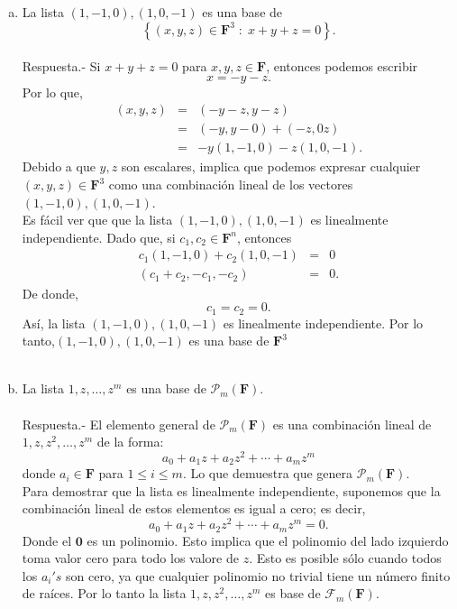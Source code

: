 \begin{enumerate}[\bfseries 1.]
\begin{enumerate}[(a)]
	    \item La lista $(1,-1,0),(1,0,-1)$ es una base de
	    $$\left\{(x,y,z)\in\textbf{F}^3\; : \; x+y+z=0\right\}.$$\\
		Respuesta.-\; Si $x+y+z=0$ para $x,y,z\in \textbf{F}$, entonces podemos escribir 
		$$x=-y-z.$$ 
		Por lo que,
		$$
		\begin{array}{rcl}
		    (x,y,z)&=&(-y-z,y-z)\\
			   &=& (-y,y-0)+(-z,0z)\\
			   &=& -y(1,-1,0)-z(1,0,-1).
		\end{array}
		$$
		Debido a que $y,z$ son escalares, implica que podemos expresar cualquier $(x,y,z)\in\textbf{F}^3$ como una combinación lineal de los vectores $(1,-1,0),(1,0,-1)$. \\

		Es fácil ver que que la lista $(1,-1,0),(1,0,-1)$ es linealmente independiente. Dado que, si $c_1,c_2\in\textbf{F}^n$, entonces 
		$$
		\begin{array}{rcl}
		    c_1(1,-1,0)+c_2(1,0,-1)&=&0\\
		    (c_1+c_2,-c_1,-c_2)&=&0.
		\end{array}
		$$
		De donde,
		$$c_1=c_2=0.$$
		Así, la lista $(1,-1,0),(1,0,-1)$ es linealmente independiente. Por lo tanto,$(1,-1,0),(1,0,-1)$ es una base de $\textbf{F}^3$\\\\

	    \item La lista $1,z,\ldots,z^m$ es una base de $\mathcal{P}_m(\textbf{F})$.\\\\
		Respuesta.-\; El elemento general de $\mathcal{P}_m(\textbf{F})$ es una combinación lineal de $1,z,z^2,\ldots,z^m$ de la forma:
		$$a_0+a_1z+a_2z^2+\cdots+a_mz^m$$
		donde $a_i\in \textbf{F}$ para $1\leq i \leq m$. Lo que demuestra que genera $\mathcal{P}_m(\textbf{F})$.\\

		Para demostrar que la lista es linealmente independiente, suponemos que la combinación lineal de estos elementos es igual a cero; es decir,
		$$a_0+a_1z+a_2z^2+\cdots+a_mz^m=0.$$
		Donde el $\textbf{0}$ es un polinomio. Esto implica que el polinomio del lado izquierdo toma valor cero para todo los valore de $z$. Esto es posible sólo cuando todos los $a_i's$ son cero, ya que cualquier polinomio no trivial tiene un número finito de raíces. Por lo tanto la lista $1,z,z^2,\ldots,z^m$ es base de $\mathcal{F}_m(\textbf{F})$.\\\\


\end{enumerate}
\end{enumerate}
